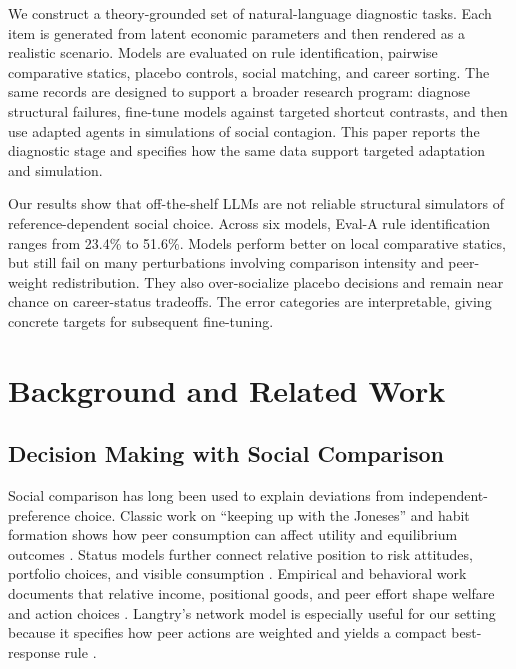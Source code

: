 \documentclass[11pt]{article}
\begin{document}
We construct a theory-grounded set of natural-language diagnostic tasks.
Each item is generated from latent economic parameters and then rendered as a realistic scenario.
Models are evaluated on rule identification, pairwise comparative statics, placebo controls, social matching, and career sorting.
The same records are designed to support a broader research program: diagnose structural failures, fine-tune models against targeted shortcut contrasts, and then use adapted agents in simulations of social contagion.
This paper reports the diagnostic stage and specifies how the same data support targeted adaptation and simulation.

Our results show that off-the-shelf LLMs are not reliable structural simulators of reference-dependent social choice.
Across six models, Eval-A rule identification ranges from 23.4\% to 51.6\%.
Models perform better on local comparative statics, but still fail on many perturbations involving comparison intensity and peer-weight redistribution.
They also over-socialize placebo decisions and remain near chance on career-status tradeoffs.
The error categories are interpretable, giving concrete targets for subsequent fine-tuning.

\section{Background and Related Work}

\subsection{Decision Making with Social Comparison}
Social comparison has long been used to explain deviations from independent-preference choice.
Classic work on ``keeping up with the Joneses'' and habit formation shows how peer consumption can affect utility and equilibrium outcomes \cite{abel1990asset, gali1994keeping, campbell1999force}.
Status models further connect relative position to risk attitudes, portfolio choices, and visible consumption \cite{robson1992status, bakshi1996spirit, demarzo2004diversification, demarzo2008relative, roussanov2010diversification}.
Empirical and behavioral work documents that relative income, positional goods, and peer effort shape welfare and action choices \cite{clark2008relative, frank1985demand, cohn2014social}.
Langtry's network model is especially useful for our setting because it specifies how peer actions are weighted and yields a compact best-response rule \cite{langtry2023keeping}.
\end{document}
